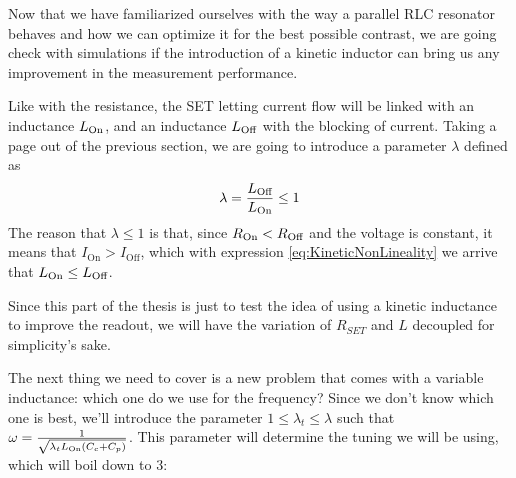 \documentclass[../main.tex]{subfiles}
\begin{document}
Now that we have familiarized ourselves with the way a parallel RLC resonator
behaves and how we can optimize it for the best possible contrast, we are going
check with simulations if the introduction of a kinetic inductor can bring
us any improvement in the measurement performance.


Like with the resistance, the SET letting current flow will be
linked with an inductance \(L_{\text{On}}\), and an inductance
\(L_{\text{Off}}\) with the blocking of current. Taking a page out of the previous
section, we are going to introduce a parameter \(\lambda\) defined as
\begin{equation*}
\label{eq:LambdaDef}
    \lambda = \frac{L_{\text{Off}}}{L_{\text{On}}} \leq 1
\end{equation*}
The reason that \(\lambda \leq 1\) is that, since
\(R_{\text{On}} < R_{\text{Off}}\) and the voltage is constant, it means that
\(I_{\text{On}} > I_{\text{Off}}\), which with expression
\ref{eq:KineticNonLineality} we arrive that \(L_{\text{On}} \leq L_{\text{Off}}\).

Since this part of the thesis is just to test the idea of using
a kinetic inductance to improve the readout, we will have the variation
of \(R_{SET}\) and \(L\) decoupled for simplicity's sake.

The next thing we need to cover is a new problem that comes with a variable
inductance: which one do we use for the frequency? Since we don't know which
one is best, we'll introduce the parameter \(1 \leq \lambda_{t} \leq \lambda\)
such that \(\omega = \frac{1}{\sqrt{\lambda_{t}L_{\text{On}}(C_{c} + C_{p})}}\).
This parameter will determine the tuning we will be using, which will boil
down to 3:
\end{document}
